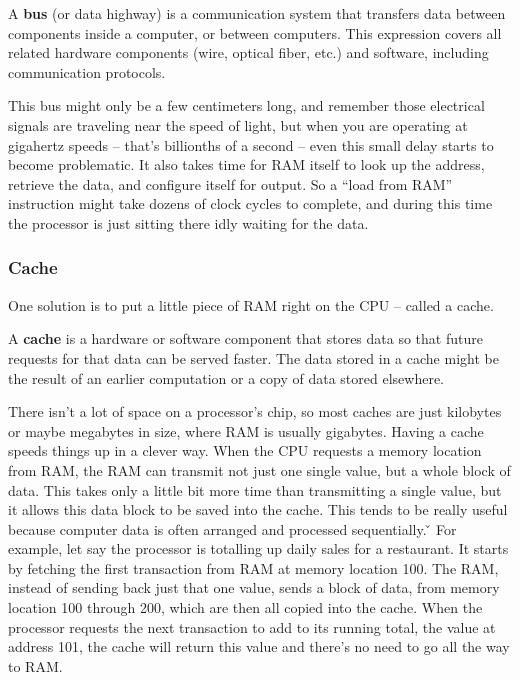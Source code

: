 \bd[Bus]
A \textbf{bus} (or data highway) is a communication system that transfers data between components inside a computer,
or between computers. This expression covers all related hardware components (wire, optical fiber, etc.) and
software, including communication protocols.
\ed

This bus might only be a few centimeters long, and remember those electrical signals are traveling near the speed of
light, but when you are operating at gigahertz speeds – that's billionths of a second – even this small delay starts
to become problematic. It also takes time for RAM itself to look up the address, retrieve the data, and configure
itself for output. So a ``load from RAM'' instruction might take dozens of clock cycles to complete, and during this
time the processor is just sitting there idly waiting for the data.

\subsubsection{Cache}

One solution is to put a little piece of RAM right on the CPU -- called a cache.

\bd[Cache]
A \textbf{cache} is a hardware or software component that stores data so that future requests for that data can be
served faster. The data stored in a cache might be the result of an earlier computation or a copy of data stored
elsewhere.
\ed

There isn't a lot of space on a processor's chip, so most caches are just kilobytes or maybe megabytes in size, where
RAM is usually gigabytes. Having a cache speeds things up in a clever way. When the CPU requests a memory location
from RAM, the RAM can transmit not just one single value, but a whole block of data. This takes only a little bit
more time than transmitting a single value, but it allows this data block to be saved into the cache. This tends to
be really useful because computer data is often arranged and processed sequentially. \v

\be
For example, let say the processor is totalling up daily sales for a restaurant. It starts by fetching the first
transaction from RAM at memory location 100. The RAM, instead of sending back just that one value, sends a block of
data, from memory location 100 through 200, which are then all copied into the cache. When the processor requests the
next transaction to add to its running total, the value at address 101, the cache will return this value and there's
no need to go all the way to RAM.
\ee

